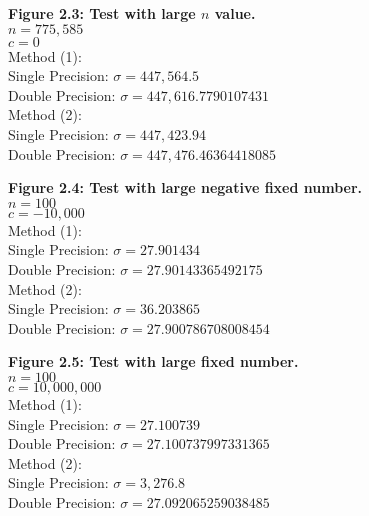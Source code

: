 \documentclass[12pt]{article}
\begin{document}
\begin{figure}[h]
	\textbf{Figure 2.3: Test with large $n$ value.}\\
	$n=775,585$\\
	$c=0$\\
	
	Method (1):\\
	Single Precision: $\sigma=447,564.5$\\
	Double Precision: $\sigma=447,616.7790107431$\\
	
	Method (2):\\
	Single Precision: $\sigma=447,423.94$\\
	Double Precision: $\sigma=447,476.46364418085$
\end{figure}

\begin{figure}[h]
	\textbf{Figure 2.4: Test with large negative fixed number.}\\
	$n=100$\\
	$c=-10,000$\\
	
	Method (1):\\
	Single Precision: $\sigma=27.901434$\\
	Double Precision: $\sigma=27.90143365492175$\\
	
	Method (2):\\
	Single Precision: $\sigma=36.203865$\\
	Double Precision: $\sigma=27.900786708008454$
\end{figure}

\begin{figure}[h]
	\textbf{Figure 2.5: Test with large fixed number.}\\
	$n=100$\\
	$c=10,000,000$\\
	
	Method (1):\\
	Single Precision: $\sigma=27.100739$\\
	Double Precision: $\sigma=27.100737997331365$\\
	
	Method (2):\\
	Single Precision: $\sigma=3,276.8$\\
	Double Precision: $\sigma=27.092065259038485$
\end{figure}
\end{document}
